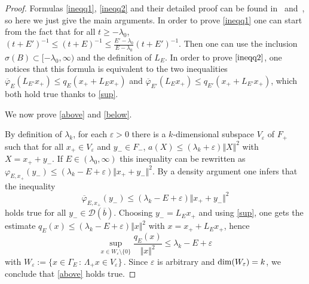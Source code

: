 \documentclass[12pt,reqno]{amsart}
\renewcommand{\(}{\left(}
\renewcommand{\)}{\right)}
\begin{document}
\begin{proof}

Formulas \eqref{ineqq1}, \eqref{ineqq2} and their detailed proof can be found in~\cite[Lemma~2.1]{DES00a} and~\cite[Lemma~2.4]{SST20}, so here we just  give the main arguments. In order to prove \eqref{ineqq1} one can start from the fact that for all $t\geq-\lambda_0$, $(t+E')^{-1}\leq (t+E)^{-1}\leq \frac{E'-\lambda_0}{E-\lambda_0}(t+E')^{-1}$. Then one can use the inclusion $\sigma(B)\subset [-\lambda_0,\infty)$ and the definition of $L_E$. In order to prove $\eqref{ineqq2}$, one notices that this formula is equivalent to the two inequalities $\overline{\varphi}_E(L_{E'}x_+)\leq q_E(x_++L_Ex_+)$ and $\overline{\varphi}_{E'}(L_{E}x_+)\leq q_{E'}(x_++L_{E'}x_+)$, which both hold true thanks to \eqref{sup}.

\noindent We now prove \eqref{above} and \eqref{below}.
 
By definition of $\lambda_k$, for each $\varepsilon>0$ there is a $k$-dimensional subspace $V_\varepsilon$ of $F_+$ such that for all $x_+\in V_\varepsilon$ and $y_-\in F_-$, $a(X)\leq (\lambda_k+\varepsilon) \Vert X\Vert^2$ with $X=x_++y_-$. If $E\in (\lambda_0,\infty)$ this inequality can be rewritten as $\varphi_{E,x_+}(y_-)\leq (\lambda_k-E+\varepsilon)\Vert x_++y_-\Vert^2$. By a density argument one infers that the inequality
$$\overline{\varphi}_{E,x_+}(y_-)\leq (\lambda_k-E+\varepsilon)\Vert x_++y_-\Vert^2$$
holds true for all $y_-\in\mathcal D(\overline{b})$. Choosing $y_-=L_Ex_+$ and using \eqref{sup}, one gets the estimate $q_E(x)\leq (\lambda_k-E+\varepsilon)\Vert x\Vert^2$ with $x=x_++L_Ex_+$, hence
\[\sup_{x\in W_\varepsilon\setminus\{0\}}\frac{q_E(x)}{\Vert x\Vert^2}\leq \lambda_k-E+\varepsilon\]
with $W_\varepsilon:=\{x\in \Gamma_E\,:\,\Lambda_+x\in V_\varepsilon\}\,.$ Since $\varepsilon$ is arbitrary and ${\rm dim}(W_\varepsilon)=k$, we conclude that
\eqref{above} holds true.


\end{proof}
\end{document}

